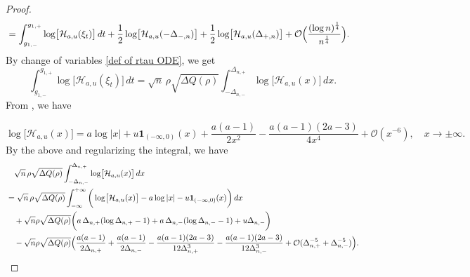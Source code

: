 \documentclass[reqno]{amsart}
\newcommand{\1}{\mathds{1}}
\numberwithin{equation}{section}
\theoremstyle{definition}
\begin{document}
\begin{proof}
\begin{align*}
&=
\int_{g_{1,-}}^{g_{1,+}}\log\bigl[\mathcal{H}_{a,u}(\xi_t)\bigr]\,dt
+\frac{1}{2}\log\bigl[\mathcal{H}_{a,u}(-\Delta_{-,n})\bigr]
+\frac{1}{2}\log\bigl[\mathcal{H}_{a,u}(\Delta_{+,n})\bigr]
+\mathcal{O}\Bigl(\frac{(\log n)^{\frac{1}{4}}}{n^{\frac{1}{4}}}\Bigr). 
\end{align*}
By change of variables \eqref{def of rtau ODE}, we get 
\[
\int_{g_{1,-}}^{g_{1,+}}\log\bigl[\mathcal{H}_{a,u}(\xi_t)\bigr]\,dt
=
\sqrt{n}\,\rho\sqrt{\Delta Q(\rho)}
\int_{-\Delta_{n,-}}^{\Delta_{n,+}}
\log\bigl[\mathcal{H}_{a,u}(x)\bigr]\,dx. 
\] 
From \cite[Section 12.9]{NIST}, we have 

\begin{equation}
\label{def of asymptotics of mathcal H au x}
\log\bigl[\mathcal{H}_{a,u}(x)\bigr]
=
a\log |x|+u\mathbf{1}_{(-\infty,0)}(x)+\frac{a(a-1)}{2x^2}-\frac{a(a-1)(2a-3)}{4x^4}+\mathcal{O}(x^{-6}),\quad x\to\pm\infty.
\end{equation}
By the above and regularizing the integral, we have 
\begin{align*}
&\quad\sqrt{n}\,\rho\sqrt{\Delta Q(\rho)}
\int_{-\Delta_{n,-}}^{\Delta_{n,+}}
\log\bigl[\mathcal{H}_{a,u}(x)\bigr]\,dx
\\
&=
\sqrt{n}\,\rho\sqrt{\Delta Q(\rho)}
\int_{-\infty}^{+\infty}
\bigg(\log\bigl[\mathcal{H}_{a,u}(x)\bigr]
-a\log|x|-u\mathbf{1}_{(-\infty,0)}(x)
\bigg)
\,dx
\\
&\quad
+\sqrt{n}\rho\sqrt{\Delta Q(\rho)}
\bigg( 
a\,\Delta_{n,+}(\log \Delta_{n,+}-1)
+a\, \Delta_{n,-}(\log \Delta_{n,-}-1)
+u\Delta_{n,-}
\bigg)
\\
&\quad
-\sqrt{n}\rho\sqrt{\Delta Q(\rho)}\Bigl( 
\frac{a(a-1)}{2\Delta_{n,+}}
+\frac{a(a-1)}{2\Delta_{n,-}}
-\frac{a(a-1)(2a-3)}{12\Delta_{n,+}^3}
-\frac{a(a-1)(2a-3)}{12\Delta_{n,-}^3}
+\mathcal{O}(\Delta_{n,+}^{-5}+\Delta_{n,-}^{-5})
\Bigr).
\end{align*}

\end{proof}
\end{document}
